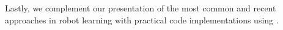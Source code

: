 Lastly, we complement our presentation of the most common and recent approaches in robot learning with practical code implementations using \lerobot.


